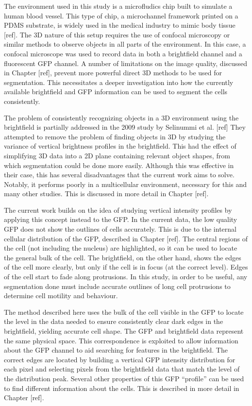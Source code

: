 The environment used in this study is a microfludics chip built to simulate a human blood vessel. This type of chip, a microchannel framework printed on a PDMS substrate, is widely used in the medical industry to mimic body tissue [ref]. The 3D nature of this setup requires the use of confocal microscopy or similar methods to observe objects in all parts of the environment. In this case, a confocal microscope was used to record data in both a brightfield channel and a fluorescent GFP channel. A number of limitations on the image quality, discussed in Chapter [ref], prevent more powerful direct 3D methods to be used for segmentation. This necessitates a deeper investigation into how the currently available brightfield and GFP information can be used to segment the cells consistently.

The problem of consistently recognizing objects in a 3D environment using the brightfield is partially addressed in the 2009 study by Selinummi et al. [ref] They attempted to remove the problem of finding objects in 3D by studying the variance of vertical brightness profiles in the brightfield. This had the effect of simplifying 3D data into a 2D plane containing relevant object shapes, from which segmentation could be done more easily. Although this was effective in their case, this has several disadvantages that the current work aims to solve. Notably, it performs poorly in a multicellular environment, necessary for this and many other studies. This is discussed in more detail in Chapter [ref].

The current work builds on the idea of studying vertical intensity profiles by applying this concept instead to the GFP. In the current data, the low quality GFP does not show the outlines of cells accurately. This is due to the internal cellular distribution of the GFP, described in Chapter [ref]. The central regions of the cell (not including the nucleus) are highlighted, so it can be used to locate the general bulk of the cell. The brightfield, on the other hand, shows the edges of the cell more clearly, but only if the cell is in focus (at the correct level). Edges of the cell start to fade along protrusions. In this study, in order to be useful, any segmentation done must include accurate outlines of long cell protrusions to determine cell motility and behaviour.

The method described here uses the bulk of the cell visible in the GFP to locate the level in the data needed to ensure consistently clear dark edges in the brightfield, yielding accurate cell shape. The GFP and brightfield data represent the same physical space. This correspondence is exploited to allow information about the GFP channel to aid searching for features in the brightfield. The correct edges are located by building a vertical GFP intensity distribution for each pixel and selecting pixels from the brightfield data that match the level of the distribution peak. Several other properties of this GFP ``profile'' can be used to find different information about the cells. This is described in more detail in Chapter [ref].
